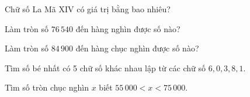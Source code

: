\begin{ex} %
Chữ số La Mã $\text{XIV}$ có giá trị bằng bao nhiêu?
\end{ex}

\begin{ex} %
Làm tròn số $76\,540$ đến hàng nghìn được số nào?
\end{ex}

\begin{ex} %
Làm tròn số $84\,900$ đến hàng chục nghìn được số nào?
\end{ex}

\begin{ex} %
Tìm số bé nhất có 5 chữ số khác nhau lập từ các chữ số $6, 0, 3, 8, 1$.
\end{ex}

\begin{ex} %
Tìm số tròn chục nghìn $x$ biết $55\,000 < x < 75\,000$.
\end{ex}

